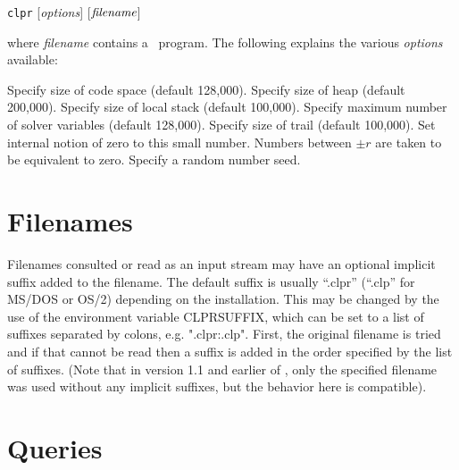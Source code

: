 {\tt clpr} [{\em options}] [$\mbox{{\em filename}}$]

\noindent
where {\em filename} contains a \CLPR\ program.
The following explains the various {\em options} available:

\begin{description}
Specify size of code space (default 128,000).
Specify size of heap (default 200,000).
Specify size of local stack (default 100,000).
Specify maximum number of solver variables 
	(default 128,000).
Specify size of trail (default 100,000).
Set internal notion of zero to this small number.
Numbers between $\pm r$ are taken to be equivalent to zero.
Specify a random number seed.
\end{description}

\section{Filenames}\label{sec:filenames}
\chgbarbegin
Filenames consulted or read as an input stream
may have an optional implicit suffix added to the filename.
The default suffix is usually ``.clpr'' (``.clp'' for MS/DOS or OS/2)
depending on the installation.
This may be changed by the use of the environment variable 
CLPRSUFFIX,
which can be set to a list of suffixes separated by colons,
e.g. ".clpr:.clp".
First, the original filename is tried and if that cannot be read
then a suffix is added in the order specified by the list of suffixes.
(Note that in version 1.1 and earlier of \CLPR{}, only the specified filename
was used without any implicit suffixes, but the behavior here is
compatible).
\chgbarend

\section{Queries}

